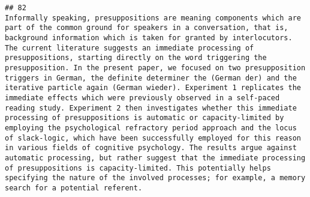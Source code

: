 \documentclass[
  english,
  man]{apa6}
\begin{document}
\begin{verbatim}
## 82                                                                                                                                                                                                                                                                                                                                                                                                                                                                                                                                                                                                                                                                                                                                                                                                                                                                                                                                                                                                                                                                                                                                                                                                                                                                                                                                                                                                                                             Informally speaking, presuppositions are meaning components which are part of the common ground for speakers in a conversation, that is, background information which is taken for granted by interlocutors. The current literature suggests an immediate processing of presuppositions, starting directly on the word triggering the presupposition. In the present paper, we focused on two presupposition triggers in German, the definite determiner the (German der) and the iterative particle again (German wieder). Experiment 1 replicates the immediate effects which were previously observed in a self-paced reading study. Experiment 2 then investigates whether this immediate processing of presuppositions is automatic or capacity-limited by employing the psychological refractory period approach and the locus of slack-logic, which have been successfully employed for this reason in various fields of cognitive psychology. The results argue against automatic processing, but rather suggest that the immediate processing of presuppositions is capacity-limited. This potentially helps specifying the nature of the involved processes; for example, a memory search for a potential referent.

\end{verbatim}
\end{document}
